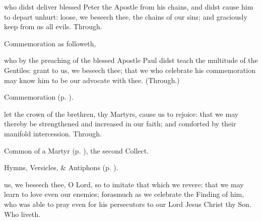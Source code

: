\collect
{} who didst deliver blessed Peter the Apostle from his chains, and didst cause him to depart unhurt: loose, we beseech thee, the chains of our sins; and graciously keep from us all evils. Through.

\begin{rubric}
	 Commemoration  as followeth,
\end{rubric}
 who by the preaching of the blessed Apostle Paul didst teach the multitude of the Gentiles: grant to us, we beseech thee; that we who celebrate his commemoration may know him to be our advocate with thee. (Through.)

\begin{rubric}
	 Commemoration  (p. \pageref{HolyMaccabeesCollect}).
\end{rubric}



\memorialCollect\label{HolyMaccabeesCollect}
 let the crown of the brethren, thy Martyrs, cause us to rejoice: that we may thereby be strengthened and increased in our faith; and comforted by their manifold intercession. Through.



\begin{rubric}
	Common of a Martyr (p. \pageref{CommonMartyrBishopCollect}), the second Collect.
\end{rubric}



\begin{rubric}
	Hymns, Versicles, \& Antiphons  (p. \pageref{SaintStephen}).
\end{rubric}

{} us, we beseech thee, O Lord, so to imitate that which we revere: that we may learn to love even our enemies; forasmuch as we celebrate the Finding of him, who was able to pray even for his persecutors to our Lord Jesus Christ thy Son. Who liveth.



